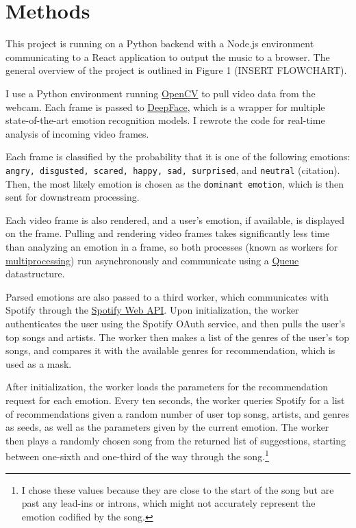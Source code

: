 \documentclass{article}
\renewcommand{\_}[1]{\underline{ #1 }}
\theoremstyle{definition}
\begin{document}
\section[sec:methods]{Methods}
\label{sec:methods}

This project is running on a Python backend with a Node.js environment communicating to a React application to output the music to a browser. The general overview of the project is outlined in Figure 1 (INSERT FLOWCHART). 

I use a Python environment running \href{https://pypi.org/project/opencv-python/}{OpenCV} to pull video data from the webcam. Each frame is passed to \href{https://pypi.org/project/deepface/}{DeepFace}, which is a wrapper for multiple state-of-the-art emotion recognition models. I rewrote the code for real-time analysis of incoming video frames. 

Each frame is classified by the probability that it is one of the following emotions: \texttt{angry, disgusted, scared, happy, sad, surprised}, and \texttt{neutral} (citation). Then, the most likely emotion is chosen as the \texttt{dominant emotion}, which is then sent for downstream processing.

Each video frame is also rendered, and a user's emotion, if available, is displayed on the frame. Pulling and rendering video frames takes significantly less time than analyzing an emotion in a frame, so both processes (known as workers for \href{https://docs.python.org/3/library/multiprocessing.html}{multiprocessing}) run asynchronously and communicate using a  \href{https://docs.python.org/3/library/queue.html}{Queue} datastructure. 

Parsed emotions are also passed to a third worker, which communicates with Spotify through the \href{https://developer.spotify.com/documentation/web-api/}{Spotify Web API}. Upon initialization, the worker authenticates the user using the Spotify OAuth service, and then pulls the user's top songs and artists. The worker then makes a list of the genres of the user's top songs, and compares it with the available genres for recommendation, which is used as a mask. 

After initialization, the worker loads the parameters for the recommendation request for each emotion. Every ten seconds, the worker queries Spotify for a list of recommendations given a random number of user top sonsg, artists, and genres as seeds, as well as the parameters given by the current emotion. The worker then plays a randomly chosen song from the returned list of suggestions, starting between one-sixth and one-third of the way through the song.\footnote{I chose these values because they are close to the start of the song but are past any lead-ins or introns, which might not accurately represent the emotion codified by the song.} 
\end{document}
